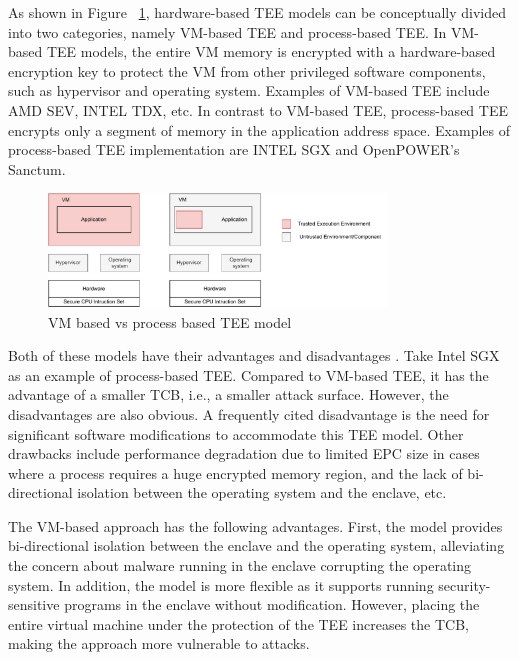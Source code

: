 As shown in Figure ~\ref{fig:vm_process_tee}, hardware-based TEE models can be conceptually divided into two categories, namely VM-based TEE and process-based TEE\cite*{101145}. In VM-based TEE models, the entire VM memory is encrypted with a hardware-based encryption key to protect the VM from other privileged 
software components, such as hypervisor and operating system. Examples of VM-based TEE include AMD SEV\cite*{AMD_SEV}, INTEL TDX\cite*{Inte_TDX}, etc. In contrast to VM-based TEE, process-based TEE encrypts only a segment of memory in the application address space. Examples of process-based TEE implementation 
are INTEL SGX\cite*{INTEL_SGX} and OpenPOWER's Sanctum\cite*{Costan2016SanctumMH}.
\begin{figure}[H]
  \centering
  \includegraphics[width=0.8\textwidth]{images/vm_process_tee.pdf}
  \caption[VM based vs process based TEE model]{VM based vs process based TEE model}
  \label{fig:vm_process_tee}
\end{figure}

Both of these models have their advantages and disadvantages\cite*{10.3389/fcomp.2022.930741} \cite*{Execution_Environment_landscape} \cite*{101145}. Take Intel SGX as an example of process-based TEE. Compared to VM-based TEE, it has the advantage of a smaller TCB, i.e., a smaller attack surface. However, the disadvantages are also obvious. A frequently 
cited disadvantage is the need for significant software modifications to accommodate this TEE model. Other drawbacks include performance degradation due to limited EPC size in cases where a process requires a huge encrypted memory region, and the lack of bi-directional isolation 
between the operating system and the enclave, etc.


The VM-based approach has the following advantages. First, the model provides bi-directional isolation between the enclave and the operating system, alleviating the concern about malware running in the enclave corrupting the operating system. In addition, the model is more 
flexible as it supports running security-sensitive programs in the enclave without modification. However, placing the entire virtual machine under the protection of the TEE increases the TCB, making the approach more vulnerable to attacks.


